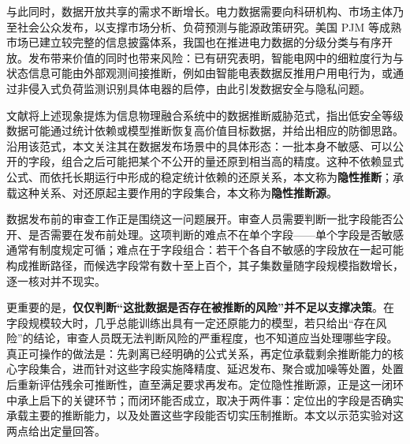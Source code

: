\documentclass[UTF8,zihao=5,twoside]{ctexart}
\begin{document}
与此同时，数据开放共享的需求不断增长。电力数据需要向科研机构、市场主体乃至社会公众发布，以支撑市场分析、负荷预测与能源政策研究\cite{ref-zhu-sharing}。美国 PJM 等成熟市场已建立较完整的信息披露体系\cite{ref-ma-pjm,ref-pjm-dataminer}，我国也在推进电力数据的分级分类与有序开放。发布带来价值的同时也带来风险：已有研究表明，智能电网中的细粒度行为与状态信息可能由外部观测间接推断，例如由智能电表数据反推用户用电行为\cite{ref-sankar,ref-giaconi}，或通过非侵入式负荷监测识别具体电器的启停\cite{ref-chen-privacy}，由此引发数据安全与隐私问题\cite{ref-adewole,ref-zhang-sgcc}。

文献\cite{ref-liu-data-inference}将上述现象提炼为信息物理融合系统中的数据推断威胁范式，指出低安全等级数据可能通过统计依赖或模型推断恢复高价值目标数据，并给出相应的防御思路。沿用该范式，本文关注其在数据发布场景中的具体形态：一批本身不敏感、可以公开的字段，组合之后可能把某个不公开的量还原到相当高的精度。这种不依赖显式公式、而依托长期运行中形成的稳定统计依赖的还原关系，本文称为\textbf{隐性推断}；承载这种关系、对还原起主要作用的字段集合，本文称为\textbf{隐性推断源}。

数据发布前的审查工作正是围绕这一问题展开。审查人员需要判断一批字段能否公开、是否需要在发布前处理。这项判断的难点不在单个字段——单个字段是否敏感通常有制度规定可循；难点在于字段组合：若干个各自不敏感的字段放在一起可能构成推断路径，而候选字段常有数十至上百个，其子集数量随字段规模指数增长，逐一核对并不现实。

更重要的是，\textbf{仅仅判断“这批数据是否存在被推断的风险”并不足以支撑决策}。在字段规模较大时，几乎总能训练出具有一定还原能力的模型，若只给出“存在风险”的结论，审查人员既无法判断风险的严重程度，也不知道应当处理哪些字段。真正可操作的做法是：先剥离已经明确的公式关系，再定位承载剩余推断能力的核心字段集合，进而针对这些字段实施降精度、延迟发布、聚合或加噪等处置，处置后重新评估残余可推断性，直至满足要求再发布。定位隐性推断源，正是这一闭环中承上启下的关键环节；而闭环能否成立，取决于两件事：定位出的字段是否确实承载主要的推断能力，以及处置这些字段能否切实压制推断。本文以示范实验对这两点给出定量回答。
\end{document}
